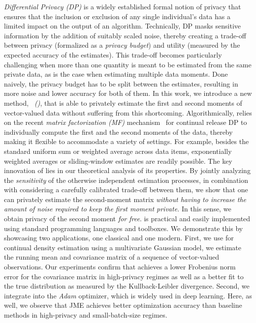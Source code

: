 \emph{Differential Privacy (DP)} is a widely established formal notion of privacy that ensures that the inclusion or exclusion of any single individual’s data has a limited impact on the output of an algorithm. 
%
Technically, DP masks sensitive information by the addition of suitably scaled noise, thereby creating a trade-off between privacy (formalized as a \emph{privacy budget}) and utility (measured by the expected accuracy of the estimates).
%
This trade-off becomes particularly challenging when more than one quantity is meant to be estimated from the same private data, as is the case when estimating multiple data moments. 
%
Done naively, the privacy budget has to be split between the estimates, resulting in more noise and lower accuracy for both of them. 
In this work, we introduce a new method, \emph{\method\ (\acronym)}, that is able to privately estimate the first and second moments of vector-valued data without suffering from this shortcoming.
%
Algorithmically, \acronym relies on the recent \emph{matrix factorization (MF)} mechanism~\citep{li2015matrix} for continual release DP
to individually compute the first and the second moments of the data, thereby making it flexible to accommodate a variety of settings. 
%
For example, besides the standard uniform sum or weighted average across data items, exponentially weighted averages or sliding-window estimates are readily possible.
%
The key innovation of \acronym lies in our theoretical analysis of its properties. By jointly analyzing the \emph{sensitivity} of the otherwise independent estimation processes, in combination with considering a carefully calibrated trade-off between them, we show that one can privately estimate the second-moment matrix \emph{without having to increase the amount of noise required to keep the first moment private.}
%
In this sense, we obtain privacy of the second moment \emph{for free}. 
%
\acronym is practical and easily implemented using standard programming languages and toolboxes. 
We demonstrate this by showcasing two applications, one classical and one modern.
%
First, we use \acronym for continual density estimation using a multivariate Gaussian model, \eg we estimate the running mean and covariance matrix of a sequence of vector-valued observations. 
%
Our experiments confirm that \acronym achieves a lower Frobenius norm error for the covariance matrix in high-privacy regimes as well as a better fit to the true distribution as measured by the Kullback-Leibler divergence.
%
Second, we integrate \acronym into the \emph{Adam} optimizer, which is widely used in deep learning. 
% 
Here, as well, we observe that JME achieves better optimization accuracy than baseline methods in high-privacy and small-batch-size regimes.


